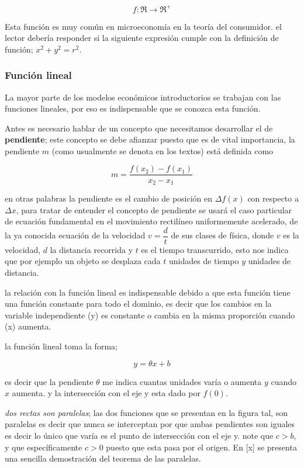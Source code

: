 \documentclass[12pt]{article}
\begin{document}
$$f:\Re \longrightarrow \Re^{+}$$

Esta función es muy común en microeconomía en la teoría del consumidor. el lector debería responder si la siguiente expresión cumple con la definición de función; $x^{2}+y^{2}=r^{2}$.

\subsubsection{Función lineal}

La mayor parte de los modelos económicos introductorios se trabajan con las funciones lineales, por eso es indispensable que se conozca esta función.

Antes es necesario hablar de un concepto que necesitamos desarrollar el de \textbf{pendiente}; este concepto se debe afianzar puesto que es de vital  importancia, la pendiente $m$ (como usualmente se denota en los textos) está definida como 

$$ m = \dfrac{f(x_{2})-f(x_{1})}{x_{2}-x_{1}}$$


en otras palabras la pendiente es el cambio de posición en $\Delta f(x)$ con respecto a $\Delta x$, para tratar de entender el concepto de pendiente se usará el caso particular de ecuación fundamental en el movimiento rectilíneo uniformemente acelerado, de la ya conocida ecuación de la velocidad $v=\dfrac{d}{t}$ de sus clases de física, donde $v$ es la velocidad, $d$ la distancia recorrida y $t$ es el tiempo transcurrido, esto nos indica que por ejemplo un objeto se desplaza cada $t$ unidades de tiempo $y$  unidades de distancia.


la relación con la función lineal es indispensable debido a que esta función tiene una función constante para todo el dominio, es decir que los cambios en la variable independiente (y) es constante o cambia en la misma proporción cuando (x) aumenta.


la función lineal toma la forma;

$$y=\theta x+ b$$

es decir que la pendiente $\theta$ me indica cuantas unidades varía o aumenta $y$ cuando $x$	 aumenta.  y la intersección con el eje y esta dado por $f(0)$.

\textit{dos rectas son paralelas}; las dos funciones que se presentan en la figura tal, son paralelas es decir que nunca se interceptan por que ambas pendientes son iguales es decir lo único que varía es el punto de intersección con el eje y. note que $c>b$,  y que específicamente $c>0$ puesto que esta pasa por el origen. En [x] se presenta una sencilla demostración  del teorema de las paralelas.
\end{document}

